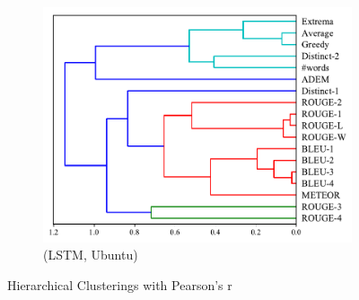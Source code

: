 \begin{figure}[htb]
\begin{subfigure}{0.35\linewidth}
        \includegraphics[width=\linewidth]{figure/plot/hierarchy/v3/pearson/lstm/ubuntu/plot.pdf}
        \caption{(LSTM, Ubuntu)}
    \end{subfigure}
    \centering
    \caption{Hierarchical Clusterings with Pearson's r}
    \label{fig:hierarchy}
\end{figure}
